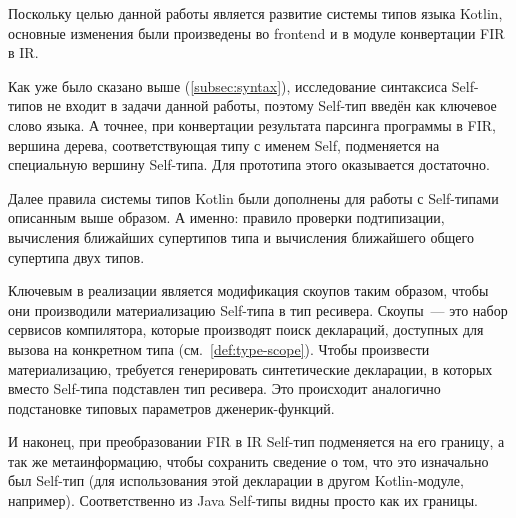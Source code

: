 Поскольку целью данной работы является развитие системы типов языка Kotlin, основные изменения были произведены во frontend и в модуле конвертации FIR в IR.

Как уже было сказано выше (\ref{subsec:syntax}), исследование синтаксиса Self-типов не входит в задачи данной работы, поэтому Self-тип введён как ключевое слово языка.
А точнее, при конвертации результата парсинга программы в FIR, вершина дерева, соответствующая типу с именем Self, подменяется на специальную вершину Self-типа.
Для прототипа этого оказывается достаточно.

Далее правила системы типов Kotlin были дополнены для работы с Self-типами описанным выше образом.
А именно: правило проверки подтипизации, вычисления ближайших супертипов типа и вычисления ближайшего общего супертипа двух типов.

Ключевым в реализации является модификация скоупов таким образом, чтобы они производили материализацию Self-типа в тип ресивера.
Скоупы~--- это набор сервисов компилятора, которые производят поиск деклараций, доступных для вызова на конкретном типа (см.~\ref{def:type-scope}).
Чтобы произвести материализацию, требуется генерировать синтетические декларации, в которых вместо Self-типа подставлен тип ресивера.
Это происходит аналогично подстановке типовых параметров дженерик-функций.

И наконец, при преобразовании FIR в IR Self-тип подменяется на его границу, а так же метаинформацию, чтобы сохранить сведение о том, что это изначально был Self-тип (для использования этой декларации в другом Kotlin-модуле, например).
Соответственно из Java Self-типы видны просто как их границы.
